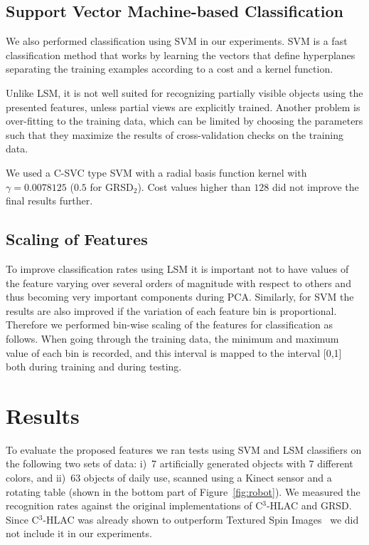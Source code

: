 \documentclass[a4paper, 10 pt, conference]{sty/ieeeconf}
\begin{document}
\subsection{Support Vector Machine-based Classification}
We also performed classification using SVM in our experiments.
SVM is a fast classification method that works by learning the vectors that define hyperplanes separating
the training examples according to a cost and a kernel function.

Unlike LSM, it is not well suited for recognizing partially visible objects using the presented features,
unless partial views are explicitly trained. Another problem is over-fitting to the training data, which
can be limited by choosing the parameters such that they maximize the results of cross-validation checks
on the training data.

We used a C-SVC type SVM with a radial basis function kernel \cite{LIBSVM} with $\gamma = 0.0078125$
($0.5$ for GRSD$_2$). Cost values higher than $128$ did not improve the final results further.

\subsection{Scaling of Features}
To improve classification rates using LSM it is important not to have values of the feature 
varying over several orders of magnitude with respect to others and thus becoming very important components
during PCA. Similarly, for SVM the results are also improved if the variation of each feature bin is
proportional. Therefore we performed bin-wise scaling of the features for classification as follows.
When going through the training data, the minimum and maximum value of each bin is recorded, and this interval 
is mapped to the interval [0,1] both during training and during testing.


\section{Results}
\label{sec:results}
To evaluate the proposed features we ran
tests using SVM and LSM classifiers on the following two sets of data: 
i)~7 artificially generated objects with 7 different colors, and
ii)~63 objects of daily use, scanned using a Kinect sensor and a rotating table
(shown in the bottom part of Figure~\ref{fig:robot}). 
We measured the recognition rates against the original implementations of C$^3$-HLAC and 
GRSD. 
Since C$^3$-HLAC was already shown to outperform Textured Spin Images~\cite{cortelazzo2006}
we did not include it in our experiments.
\end{document}

